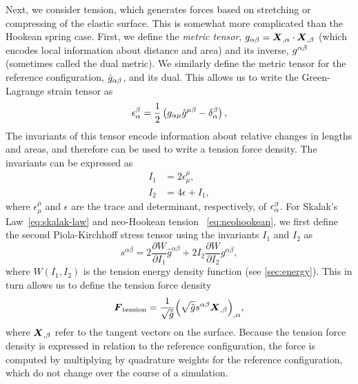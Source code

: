 Next, we consider tension, which generates forces based on stretching or compressing of the elastic surface. This
is somewhat more complicated than the Hookean spring case.  First, we define the \emph{metric tensor},
$g_{\alpha\beta} = \boldsymbol{X}_{,\alpha}\cdot\boldsymbol{X}_{,\beta}$  (which encodes local information about distance and area)
and its inverse, $g^{\alpha\beta}$ (sometimes called the dual metric). We similarly define the metric tensor
for the reference configuration, $\hat{g}_{\alpha\beta}$, and its dual. This allows us to write the
Green-Lagrange strain tensor as
\begin{equation}
    \epsilon_\alpha^\beta = \frac12\left(g_{\alpha\mu}\hat{g}^{\mu\beta}-\delta_\alpha^\beta\right),
\end{equation}
The invariants of this tensor encode information about relative changes in lengths and areas, and therefore can be
used to write a tension force density. The invariants can be expressed as
\begin{align}
    I_1 &= 2\epsilon_\mu^\mu, \\
    I_2 &= 4\epsilon + I_1,
\end{align}
where $\epsilon_\mu^\mu$ and $\epsilon$ are the trace and determinant, respectively, of
$\epsilon_\alpha^{\smash\beta}$. For Skalak's Law~\eqref{eq:skalak-law} and neo-Hookean tension~%
\eqref{eq:neohookean}, we first define the second Piola-Kirchhoff stress tensor using the invariants $I_1$ and
$I_2$ as
\begin{equation}
    s^{\alpha\beta} = 2\frac{\partial W}{\partial I_1} \hat{g}^{\alpha\beta} + 2I_2\frac{\partial W}{\partial I_2} g^{\alpha\beta},
\end{equation}
where $W(I_1,I_2)$ is the tension energy density function (see \cref{sec:energy}). This in turn allows us to
define the tension force density~\cite{Maxian:2018ek}
\begin{equation}\label{eq:tension-force}
    \boldsymbol{F}_\text{tension} = \frac{1}{\sqrt{\hat{g}}}{\left(\sqrt{\hat{g}}s^{\alpha\beta}\boldsymbol{X}_{,\beta}\right)}_{,\alpha},
\end{equation}
where $\boldsymbol{X}_{,\beta}$ refer to the tangent vectors on the surface. Because the tension force density is expressed in
relation to the reference configuration, the force is computed by multiplying by quadrature weights for the
reference configuration, which do not change over the course of a simulation.

